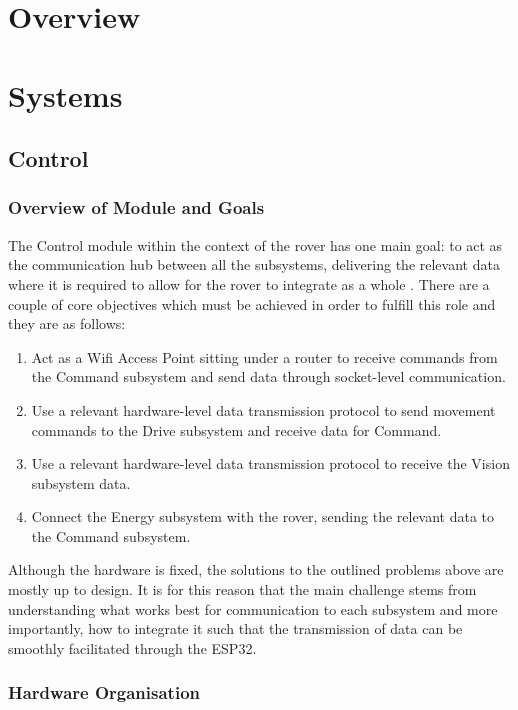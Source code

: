 \documentclass[a4paper]{article}
\begin{document}
\newpage

\section{Overview}

\section{Systems}

\subsection{Control}

\subsubsection{Overview of Module and Goals}
The Control module within the context of the rover has one main goal: 
to act as the communication hub between all the subsystems, delivering
the relevant data where it is required to allow for the rover to integrate
as a whole \cite{MarsRoverSpec}. There are a couple of core objectives which must be 
achieved in order to fulfill this role and they are as follows:

\begin{enumerate}
    \item Act as a Wifi Access Point sitting under a router to receive
    commands from the Command subsystem and send data through socket-level communication.
    \item Use a relevant hardware-level data transmission protocol to
    send movement commands to the Drive subsystem and receive data for Command. 
    \item Use a relevant hardware-level data transmission protocol to receive
    the Vision subsystem data.
    \item Connect the Energy subsystem with the rover, sending the relevant data
    to the Command subsystem.
\end{enumerate}

Although the hardware is fixed, the solutions to the outlined problems
above are mostly up to design. It is for this reason that the main challenge
stems from understanding what works best for communication to each subsystem
and more importantly, how to integrate it such that the transmission of data
can be smoothly facilitated through the ESP32.

\subsubsection{Hardware Organisation}
\end{document}
